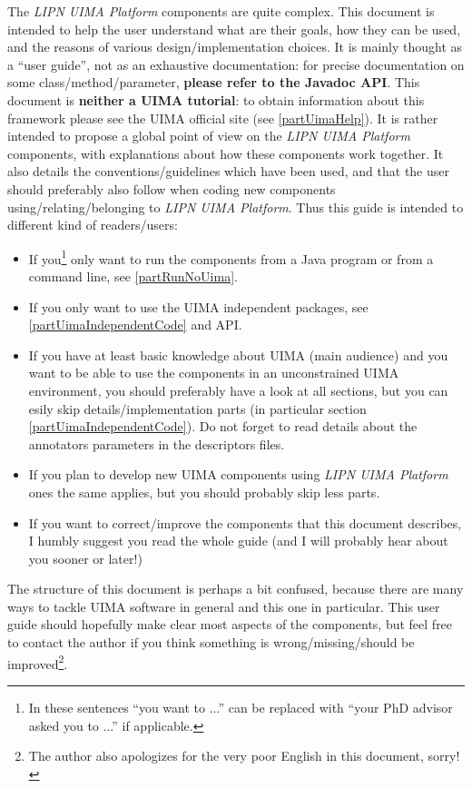\documentclass{article}
\newcommand{\softName}{{\em LIPN UIMA Platform}\xspace}
\newenvironment{xitemize}{
\begin{itemize}
  \setlength{\itemsep}{.3\baselineskip}
  \setlength{\topsep}{0pt}
  \setlength{\parskip}{0pt}
  \setlength{\parsep}{0pt}
}{\end{itemize}}
\begin{document}
The \softName components are quite complex. This document is intended to help the user understand what are their goals, how they can be used, and the reasons of various design/implementation choices. It is mainly thought as a ``user guide'', not as an exhaustive documentation: for precise documentation on some class/method/parameter, {\bf please refer to the  Javadoc API}. This document is {\bf neither a UIMA tutorial}: to obtain information about this framework please see the UIMA official site (see \ref{partUimaHelp}). It is rather intended to propose a global point of view on the \softName components, with explanations about how these components work together. It also details the conventions/guidelines which have been used, and that the user should preferably also follow when coding new components using/relating/belonging to \softName. Thus this guide is intended to different kind of readers/users:
\begin{xitemize}
\item If you\footnote{In these sentences ``you want to ...'' can be replaced with ``your PhD advisor asked you to ...'' if applicable.} only want to run the components from a Java program or from a command line, see \ref{partRunNoUima}.
\item If you only want to use the UIMA independent packages, see \ref{partUimaIndependentCode} and API.
\item  If you have at least basic knowledge about UIMA (main audience) and you want to be able to use the components in an unconstrained UIMA environment, you should preferably have a look at all sections, but you can esily skip details/implementation parts (in particular section \ref{partUimaIndependentCode}). Do not forget to read details about the annotators parameters in the descriptors files.
\item If you plan to develop new UIMA components using \softName ones the same applies, but you should probably skip less parts.
\item If you want to correct/improve the components that this document describes, I humbly suggest you read the whole guide (and I will probably hear about you sooner or later!)
\end{xitemize}

The structure of this document is perhaps a bit confused, because there are many ways to tackle UIMA software in general and this one in particular. This user guide should hopefully make clear most aspects of the components, but feel free to contact the author if you think something is wrong/missing/should be improved\footnote{The author also apologizes for the very poor English in this document, sorry!}. 
\smallskip
\end{document}
